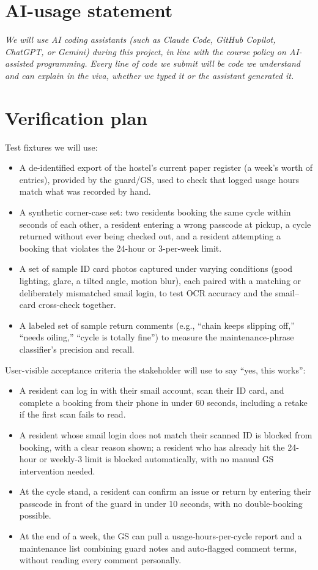 \documentclass[11pt]{article}
\begin{document}
\section{AI-usage statement}
\emph{We will use AI coding assistants (such as Claude Code, GitHub Copilot, ChatGPT, or Gemini) during this project, in line with the course policy on AI-assisted programming. Every line of code we submit will be code we understand and can explain in the viva, whether we typed it or the assistant generated it.}

\section{Verification plan}
Test fixtures we will use:
\begin{itemize}[leftmargin=*]
  \item A de-identified export of the hostel's current paper register (a week's worth of entries), provided by the guard/GS, used to check that logged usage hours match what was recorded by hand.
  \item A synthetic corner-case set: two residents booking the same cycle within seconds of each other, a resident entering a wrong passcode at pickup, a cycle returned without ever being checked out, and a resident attempting a booking that violates the 24-hour or 3-per-week limit.
  \item A set of sample ID card photos captured under varying conditions (good lighting, glare, a tilted angle, motion blur), each paired with a matching or deliberately mismatched smail login, to test OCR accuracy and the smail--card cross-check together.
  \item A labeled set of sample return comments (e.g., ``chain keeps slipping off,'' ``needs oiling,'' ``cycle is totally fine'') to measure the maintenance-phrase classifier's precision and recall.
\end{itemize}

User-visible acceptance criteria the stakeholder will use to say ``yes, this works'':
\begin{itemize}[leftmargin=*]
  \item A resident can log in with their smail account, scan their ID card, and complete a booking from their phone in under 60 seconds, including a retake if the first scan fails to read.
  \item A resident whose smail login does not match their scanned ID is blocked from booking, with a clear reason shown; a resident who has already hit the 24-hour or weekly-3 limit is blocked automatically, with no manual GS intervention needed.
  \item At the cycle stand, a resident can confirm an issue or return by entering their passcode in front of the guard in under 10 seconds, with no double-booking possible.
  \item At the end of a week, the GS can pull a usage-hours-per-cycle report and a maintenance list combining guard notes and auto-flagged comment terms, without reading every comment personally.
\end{itemize}
\end{document}
